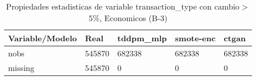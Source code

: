 \begin{table}[H]
\centering
\fontsize{8}{14}\selectfont
\caption{Propiedades estadisticas de variable transaction\_type con cambio\ensuremath{>}5\%, Economicos (B-3)}
\label{table-stats-economicos-b-3-transaction_type-short}
\begin{tabular}{|l|m{10em}|m{10em}|m{10em}|m{10em}|}
\hline
 \rowcolor[gray]{0.8}
Variable/Modelo & Real & tddpm\_mlp & smote-enc & ctgan \\
\hline nobs & 545870 & 682338 & 682338 & 682338 \\
\hline missing & 545870 & 0 & 0 & 0 \\
\hline
\end{tabular}
\end{table}
